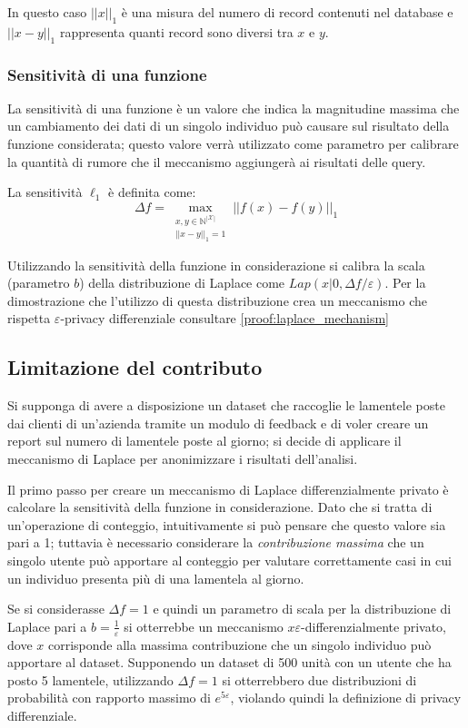 In questo caso $||x||_1$ è una misura del numero di record contenuti nel database e $||x - y||_1$ rappresenta quanti record sono diversi tra $x$ e $y$.

\subsubsection{Sensitività di una funzione}
La sensitività di una funzione è un valore che indica la magnitudine massima che un cambiamento dei dati di un singolo individuo può causare sul risultato della funzione considerata; questo valore verrà utilizzato come parametro per calibrare la quantità di rumore che il meccanismo aggiungerà ai risultati delle query.

La sensitività $\ell_1$ è definita come:
\begin{equation}
    \Delta f = \max_{\substack{x,y \in \mathbb{N}^{|\mathcal{X}|}\\||x - y||_1 = 1}} ||f(x) - f(y)||_1
\end{equation}

Utilizzando la sensitività della funzione in considerazione si calibra la scala (parametro $b$) della distribuzione di Laplace come $Lap(x|0,\Delta f/\varepsilon)$. Per la dimostrazione che l'utilizzo di questa distribuzione crea un meccanismo che rispetta $\varepsilon$-privacy differenziale consultare \ref{proof:laplace_mechanism}

\subsection{Limitazione del contributo}
Si supponga di avere a disposizione un dataset che raccoglie le lamentele poste dai clienti di un'azienda tramite un modulo di feedback e di voler creare un report sul numero di lamentele poste al giorno; si decide di applicare il meccanismo di Laplace per anonimizzare i risultati dell'analisi.

Il primo passo per creare un meccanismo di Laplace differenzialmente privato è calcolare la sensitività della funzione in considerazione. Dato che si tratta di un'operazione di conteggio, intuitivamente si può pensare che questo valore sia pari a 1; tuttavia è necessario considerare la \textit{contribuzione massima} che un singolo utente può apportare al conteggio per valutare correttamente casi in cui un individuo presenta più di una lamentela al giorno.

Se si considerasse $\Delta f = 1$ e quindi un parametro di scala per la distribuzione di Laplace pari a $b = \frac{1}{\varepsilon}$ si otterrebbe un meccanismo $x\varepsilon$-differenzialmente privato, dove $x$ corrisponde alla massima contribuzione che un singolo individuo può apportare al dataset. Supponendo un dataset di 500 unità con un utente che ha posto 5 lamentele, utilizzando $\Delta f = 1$ si otterrebbero due distribuzioni di probabilità con rapporto massimo di $e^{5\varepsilon}$, violando quindi la definizione di privacy differenziale.

